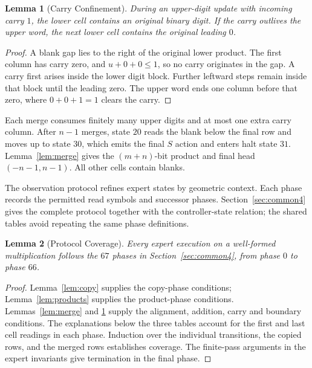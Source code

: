 \documentclass[11pt,a4paper]{article}
\newtheorem{lemma}{Lemma}
\newcommand{\sectiontitle}[2]{\refstepcounter{section}\vspace*{2pt}{\LARGE\bfseries\color{Teal}\thesection\quad #2}\par\vspace{7pt}}
\begin{document}
\begin{lemma}[Carry Confinement]\label{lem:carry}
During an upper-digit update with incoming carry $1$, the lower cell
contains an original binary digit. If the carry outlives the upper word,
the next lower cell contains the original leading $0$.
\end{lemma}
\begin{proof}
A blank gap lies to the right of the original lower product. The first
column has carry zero, and $u+0+0\le1$, so no carry originates in the gap.
A carry first arises inside the lower digit block. Further leftward steps
remain inside that block until the leading zero. The upper word ends one
column before that zero, where $0+0+1=1$ clears the carry.
\end{proof}

Each merge consumes finitely many upper digits and at most one extra carry
column. After $n-1$ merges, state $20$ reads the blank below the final row
and moves up to state $30$, which emits the final $S$ action and enters halt
state $31$. Lemma~\ref{lem:merge} gives the $(m+n)$-bit product and final head
$(-n-1,n-1)$. All other cells contain blanks.

\clearpage
\sectiontitle{3 \enspace OBSERVATION PROTOCOL}{Observation Protocol}\label{sec:common3}
The observation protocol refines expert states by geometric context. Each phase records the permitted read symbols and successor phases. Section~\ref{sec:common4} gives the complete protocol together with the controller-state relation; the shared tables avoid repeating the same phase definitions.

\begin{lemma}[Protocol Coverage]\label{lem:coverage}
Every expert execution on a well-formed multiplication follows the
$67$ phases in Section~\ref{sec:common4}, from phase $0$ to phase $66$.
\end{lemma}
\begin{proof}
Lemma~\ref{lem:copy} supplies the copy-phase conditions; Lemma~\ref{lem:products}
supplies the product-phase conditions. Lemmas~\ref{lem:merge} and
\ref{lem:carry} supply the alignment, addition, carry and boundary conditions.
The explanations below the three tables account for the first and last cell readings in each phase. Induction over the individual transitions, the copied rows,
and the merged rows establishes coverage. The finite-pass arguments in
the expert invariants give termination in the final phase.
\end{proof}
\end{document}
